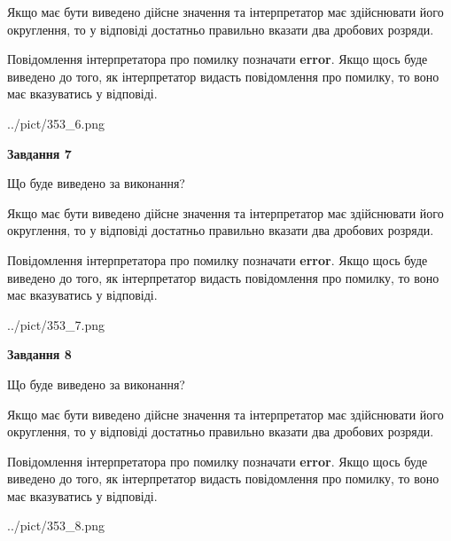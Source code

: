 \documentclass[12pt, ukrainian]{article}
\begin{document}
{\begin {Large}
Якщо має бути виведено дійсне значення та інтерпретатор має здійснювати його округлення, 
то у відповіді достатньо правильно вказати два дробових розряди.

Повідомлення інтерпретатора про помилку позначати \textbf{error}.
Якщо щось буде виведено до того, як інтерпретатор видасть повідомлення про помилку, 
то воно має вказуватись у відповіді. \par

\begin{center}
	{../pict/353_6.png}
\end{center}
\newpage

{\begin {center}\textbf{Завдання 7}\end {center}}\par
Що буде виведено за виконання? \par

Якщо має бути виведено дійсне значення та інтерпретатор має здійснювати його округлення, 
то у відповіді достатньо правильно вказати два дробових розряди.

Повідомлення інтерпретатора про помилку позначати \textbf{error}.
Якщо щось буде виведено до того, як інтерпретатор видасть повідомлення про помилку, 
то воно має вказуватись у відповіді. \par

\begin{center}
	{../pict/353_7.png}
\end{center}
\newpage

{\begin {center}\textbf{Завдання 8}\end {center}}\par
Що буде виведено за виконання? \par

Якщо має бути виведено дійсне значення та інтерпретатор має здійснювати його округлення, 
то у відповіді достатньо правильно вказати два дробових розряди.

Повідомлення інтерпретатора про помилку позначати \textbf{error}.
Якщо щось буде виведено до того, як інтерпретатор видасть повідомлення про помилку, 
то воно має вказуватись у відповіді. \par

\begin{center}
	{../pict/353_8.png}
\end{center}
\newpage


\end{Large}}
\end{document}
